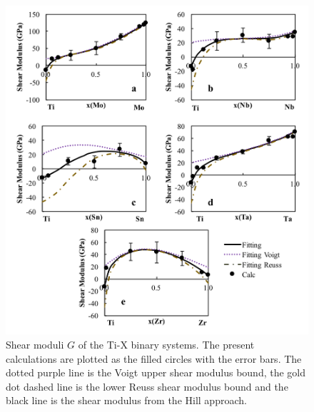 \pagebreak
\begin{figure}[H]
	\centering
	\includegraphics[width=\textwidth]{Chapter-5/Figures/tixshear.png}
	\caption{Shear moduli $G$ of the Ti-X binary systems. The present calculations are plotted as the filled circles with the error bars. The dotted purple line is the Voigt upper shear modulus bound, the gold dot dashed line is the lower Reuss shear modulus bound and the black line is the shear modulus from the Hill approach.}
	\label{Ch5-figure:tixshear}
\end{figure}


